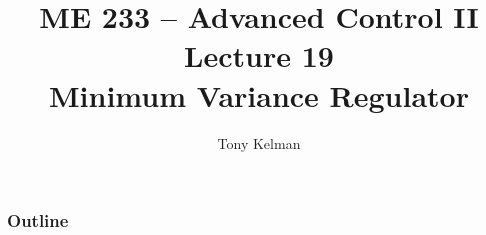 \documentclass[mathserif]{beamer}              %
\title{ME 233 -- Advanced Control II\\
    Lecture 19 \\
    Minimum Variance Regulator}
\author{Tony Kelman}
\institute{UC Berkeley}
\begin{document}
\maketitle

\begin{frame}
    \frametitle{Outline}
    \tableofcontents
\end{frame}







\end{document}
